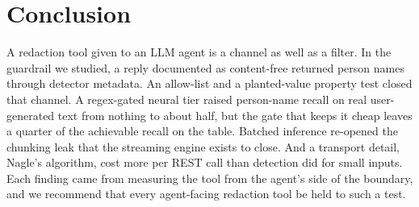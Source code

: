 \section{Conclusion}\label{sec:conclusion}

A redaction tool given to an LLM agent is a channel as well as a filter. In the guardrail we studied, a reply documented as content-free returned person names through detector metadata. An allow-list and a planted-value property test closed that channel. A regex-gated neural tier raised person-name recall on real user-generated text from nothing to about half, but the gate that keeps it cheap leaves a quarter of the achievable recall on the table. Batched inference re-opened the chunking leak that the streaming engine exists to close. And a transport detail, Nagle's algorithm, cost more per REST call than detection did for small inputs. Each finding came from measuring the tool from the agent's side of the boundary, and we recommend that every agent-facing redaction tool be held to such a test.
